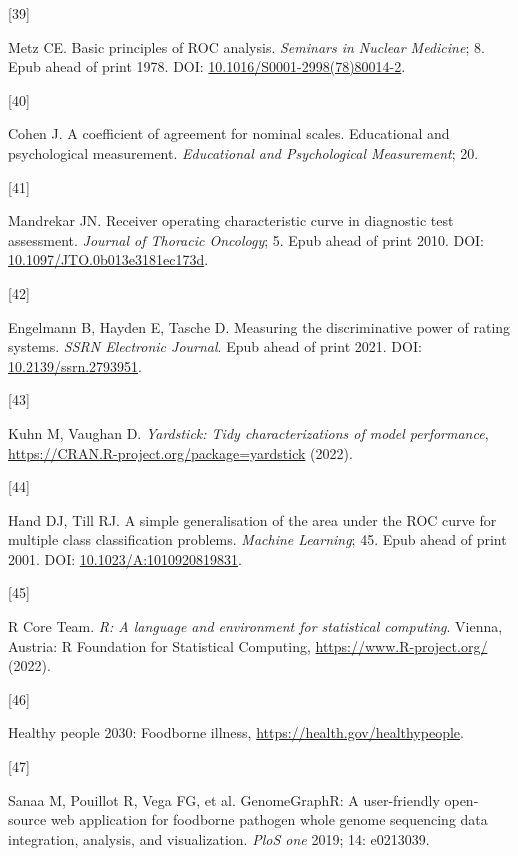 \documentclass[
  10pt,
]{article}
\newlength{\cslhangindent}
\newlength{\csllabelwidth}
\newlength{\cslentryspacingunit} %
\newenvironment{CSLReferences}[2] %
 {%
  \setlength{\parindent}{0pt}
  \ifodd #1
  \let\oldpar\par
  \def\par{\hangindent=\cslhangindent\oldpar}
  \fi
  \setlength{\parskip}{#2\cslentryspacingunit}
 }%
 {}
\newcommand{\CSLLeftMargin}[1]{\parbox[t]{\csllabelwidth}{#1}}
\newcommand{\CSLRightInline}[1]{\parbox[t]{\linewidth - \csllabelwidth}{#1}\break}
\begin{document}
\begin{CSLReferences}{0}{0}
\leavevmode{}%
\CSLLeftMargin{{[}39{]} }%
\CSLRightInline{Metz CE. Basic principles of ROC analysis. \emph{Seminars in Nuclear Medicine}; 8. Epub ahead of print 1978. DOI: \href{https://doi.org/10.1016/S0001-2998(78)80014-2}{10.1016/S0001-2998(78)80014-2}.}

\leavevmode{}%
\CSLLeftMargin{{[}40{]} }%
\CSLRightInline{Cohen J. A coefficient of agreement for nominal scales. Educational and psychological measurement. \emph{Educational and Psychological Measurement}; 20.}

\leavevmode{}%
\CSLLeftMargin{{[}41{]} }%
\CSLRightInline{Mandrekar JN. Receiver operating characteristic curve in diagnostic test assessment. \emph{Journal of Thoracic Oncology}; 5. Epub ahead of print 2010. DOI: \href{https://doi.org/10.1097/JTO.0b013e3181ec173d}{10.1097/JTO.0b013e3181ec173d}.}

\leavevmode{}%
\CSLLeftMargin{{[}42{]} }%
\CSLRightInline{Engelmann B, Hayden E, Tasche D. Measuring the discriminative power of rating systems. \emph{SSRN Electronic Journal}. Epub ahead of print 2021. DOI: \href{https://doi.org/10.2139/ssrn.2793951}{10.2139/ssrn.2793951}.}

\leavevmode{}%
\CSLLeftMargin{{[}43{]} }%
\CSLRightInline{Kuhn M, Vaughan D. \emph{Yardstick: Tidy characterizations of model performance}, \url{https://CRAN.R-project.org/package=yardstick} (2022).}

\leavevmode{}%
\CSLLeftMargin{{[}44{]} }%
\CSLRightInline{Hand DJ, Till RJ. A simple generalisation of the area under the ROC curve for multiple class classification problems. \emph{Machine Learning}; 45. Epub ahead of print 2001. DOI: \href{https://doi.org/10.1023/A:1010920819831}{10.1023/A:1010920819831}.}

\leavevmode{}%
\CSLLeftMargin{{[}45{]} }%
\CSLRightInline{R Core Team. \emph{R: A language and environment for statistical computing}. Vienna, Austria: R Foundation for Statistical Computing, \url{https://www.R-project.org/} (2022).}

\leavevmode{}%
\CSLLeftMargin{{[}46{]} }%
\CSLRightInline{Healthy people 2030: Foodborne illness, \url{https://health.gov/healthypeople}.}

\leavevmode{}%
\CSLLeftMargin{{[}47{]} }%
\CSLRightInline{Sanaa M, Pouillot R, Vega FG, et al. GenomeGraphR: A user-friendly open-source web application for foodborne pathogen whole genome sequencing data integration, analysis, and visualization. \emph{PloS one} 2019; 14: e0213039.}

\end{CSLReferences}
\end{document}
